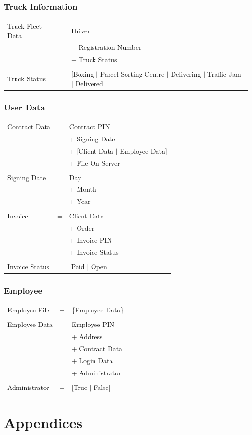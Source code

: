 \documentclass[11pt,a4paper,oneside,svgnames]{report}
\begin{document}
\subsection{Truck Information}

\begin{longtable}{p{3.5cm}p{0.5cm}p{8.5cm}}
Truck Fleet Data & = & Driver\\
&  & + Registration Number\\
&  & + Truck Status \\
\\
Truck Status & = & [Boxing $|$ Parcel Sorting Centre $|$ Delivering $|$ Traffic Jam $|$ Delivered] \\
\end{longtable}

\subsection{User Data}
\begin{longtable}{p{3.5cm}p{0.5cm}p{8.5cm}}
Contract Data & = & Contract PIN\\
& & + Signing Date\\
& & + [Client Data $|$ Employee Data]\\
& & + File On Server\\
\\
Signing Date & = & Day\\
&  & + Month\\
&  & + Year\\
\\
Invoice & = & Client Data\\
&  & + Order\\
&  & + Invoice PIN\\
&  & + Invoice Status\\
\\
Invoice Status & = & [Paid $|$ Open]\\
\end{longtable}

\subsection{Employee}

\begin{longtable}{p{3.5cm}p{0.5cm}p{8.5cm}}
Employee File & = & \{Employee Data\}\\
\\
Employee Data & = & Employee PIN\\
&  & + Address\\
&  & + Contract Data\\
&  & + Login Data\\
&  & + Administrator\\
\\
Administrator & = & [True $|$ False]
\end{longtable}


\chapter{Appendices}
\printglossaries
\end{document}
